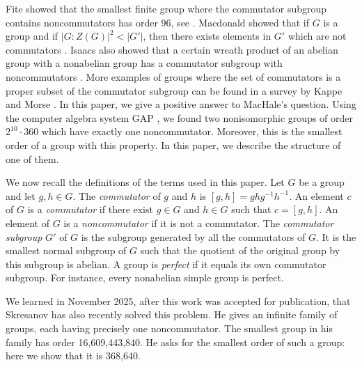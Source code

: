 \documentclass[10pt,leqno]{amsart}
\begin{document}
Fite showed that the smallest finite group where the commutator subgroup contains noncommutators has order 96, see \cite{Fite1902}. Macdonald showed that if $G$ is a group and if $|G:Z(G)|^2 <|G'|$, then there exists elements in $G'$ which are not commutators \cite{Macdonald1986}. Isaacs also showed that a certain wreath product of an abelian group with a nonabelian group has a commutator subgroup with noncommutators \cite{Isaacs1977}. More examples of groups  where the set of commutators is a proper subset of the commutator subgroup can be found in a survey by Kappe and Morse \cite{Kappe2005}. In this paper, we give a positive answer to MacHale's question. Using the computer algebra system GAP \cite{GAP4}, we found two nonisomorphic groups of order $2^{10}\cdot 360$ which have exactly one noncommutator. Moreover, this is the smallest order of a group with this property. In this paper, we describe the structure of one of them.

We now recall the definitions of the terms used in this paper. Let $G$ be a group and let $g,h\in G$. The \textit{commutator} of $g$ and $h$ is $[g,h]=ghg^{-1}h^{-1}$. An element $c$ of $G$ is a \textit{commutator} if there exist $g\in G$ and $h\in G$ such that $c=[g,h]$. An element of $G$ is a \textit{noncommutator} if it is not a commutator. The \textit{commutator subgroup} $G'$ of $G$ is the subgroup generated by all the commutators of $G$. It is the smallest normal subgroup of $G$ such that the quotient of the original group by this subgroup is abelian. A group is \textit{perfect} if it equals its own commutator subgroup. For instance, every nonabelian simple group is perfect.

We learned in November 2025, after this work was accepted for publication, that Skresanov \cite{skresanov2025finitegroupsexactlynoncommutator} has also recently solved this problem. He gives an infinite family of groups, each having precisely one noncommutator. The smallest group in his family has order 16,609,443,840. He asks for the smallest order of such a group: here we show that it is 368,640. 
\end{document}

